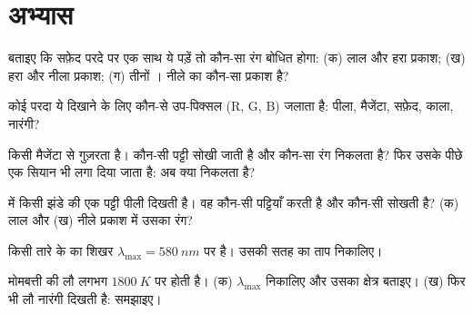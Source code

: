 \section{अभ्यास}

\begin{exercise}[$\star$]\label{exo:g11:color-light-sources:1}
बताइए कि सफ़ेद परदे पर एक साथ ये पड़ें तो कौन-सा रंग बोधित होगा: (क) लाल
और हरा प्रकाश; (ख) हरा और नीला प्रकाश; (ग) तीनों । नीले का
 कौन-सा प्रकाश है?
\end{exercise}

\begin{exercise}[$\star$]\label{exo:g11:color-light-sources:2}
कोई परदा ये दिखाने के लिए कौन-से उप-पिक्सल (R, G, B) जलाता है: पीला,
मैजेंटा, सफ़ेद, काला, नारंगी?
\end{exercise}

\begin{exercise}[$\star$]\label{exo:g11:color-light-sources:3}
 किसी मैजेंटा  से गुज़रता है। कौन-सी
पट्टी सोखी जाती है और कौन-सा रंग निकलता है? फिर उसके पीछे एक सियान
 भी लगा दिया जाता है: अब क्या निकलता है?
\end{exercise}

\begin{exercise}[$\star$]\label{exo:g11:color-light-sources:4}
 में किसी झंडे की एक पट्टी पीली दिखती है। वह कौन-सी
पट्टियाँ  करती है और कौन-सी सोखती है? (क) लाल और (ख) नीले प्रकाश
में उसका रंग?
\end{exercise}

\begin{exercise}[$\star$]\label{exo:g11:color-light-sources:5}
किसी तारे के  का शिखर $\lambda_{\max} = \qty{580}{nm}$ पर है। उसकी सतह का
ताप निकालिए।
\end{exercise}

\begin{exercise}[$\star\star$]\label{exo:g11:color-light-sources:6}
मोमबत्ती की लौ लगभग $\qty{1800}{K}$ पर होती है। (क) $\lambda_{\max}$ निकालिए और उसका
क्षेत्र बताइए। (ख) फिर भी लौ नारंगी दिखती है: समझाइए।
\end{exercise}

